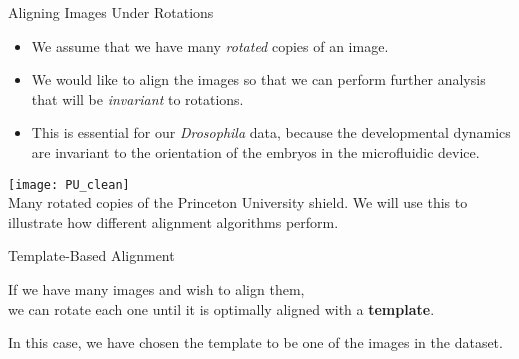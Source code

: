%

\begin{frame}{Aligning Images Under Rotations}
	
	\begin{itemize}
	\item We assume that we have many {\em rotated} copies of an image.
	\item We would like to align the images so that we can perform further analysis that will be {\em invariant} to rotations. 
	\item This is essential for our {\em Drosophila} data, because the developmental dynamics are invariant to the orientation of the embryos in the microfluidic device.
	\end{itemize}

	\centering
	\texttt{[image: PU\_clean]}\\
	{\scriptsize Many rotated copies of the Princeton University shield. We will use this to illustrate how different alignment algorithms perform. }	

\end{frame}

\begin{frame}{Template-Based Alignment}
	\centering	
	
	If we have many images and wish to align them, \\ we can rotate each one until it is optimally aligned with a {\bf template}.

	In this case, we have chosen the template to be one of the images in the dataset.

		
\end{frame}

